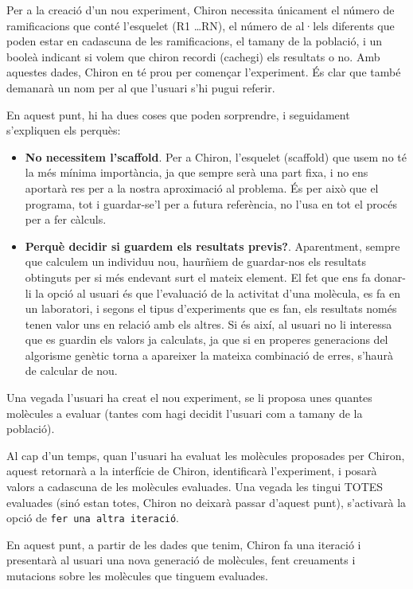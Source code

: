 \documentclass[titlepage,a4paper,12pt]{book}
\begin{document}
Per a la creació d'un nou experiment, Chiron necessita únicament el número de
ramificacions que conté l'esquelet (R1 \dots RN), el número de al·lels diferents que
poden estar en cadascuna de les ramificacions, el tamany de la població, i un booleà
indicant si volem que chiron recordi (cachegi) els resultats o no.  Amb aquestes
dades, Chiron en té prou per començar l'experiment.  És clar que també demanarà
un nom per al que l'usuari s'hi pugui referir.

En aquest punt, hi ha dues coses que poden sorprendre, i seguidament s'expliquen
els perquès:

\begin{itemize}
	\item \textbf{No necessitem l'scaffold}. Per a Chiron, l'esquelet (scaffold)
	que usem no té la més mínima importància, ja que sempre serà una part fixa,
	i no ens aportarà res per a la nostra aproximació al problema.  És per això
	que el programa, tot i guardar-se'l per a futura referència, no l'usa en tot
	el procés per a fer càlculs.

	\item \textbf{Perquè decidir si guardem els resultats previs?}.
	Aparentment, sempre que calculem un individuu nou, haurñiem de guardar-nos
	els resultats obtinguts per si més endevant surt el mateix element.  El fet
	que ens fa donar-li la opció al usuari és que l'evaluació de la activitat
	d'una molècula, es fa en un laboratori, i segons el tipus d'experiments que
	es fan, els resultats només tenen valor uns en relació amb els altres.  Si
	és així, al usuari no li interessa que es guardin els valors ja calculats,
	ja que si en properes generacions del algorisme genètic torna a apareixer la
	mateixa combinació de erres, s'haurà de calcular de nou.
\end{itemize}

Una vegada l'usuari ha creat el nou experiment, se li proposa unes quantes
molècules a evaluar (tantes com hagi decidit l'usuari com a tamany de la
població).

Al cap d'un temps, quan l'usuari ha evaluat les molècules proposades per Chiron,
aquest retornarà a la interfície de Chiron, identificarà l'experiment, i posarà
valors a cadascuna de les molècules evaluades.  Una vegada les tingui TOTES
evaluades (sinó estan totes, Chiron no deixarà passar d'aquest punt), s'activarà
la opció de \texttt{fer una altra iteració}.  

En aquest punt, a partir de les dades que tenim, Chiron fa una iteració i
presentarà al usuari una nova generació de molècules, fent creuaments i
mutacions sobre les molècules que tinguem evaluades.
\end{document}
